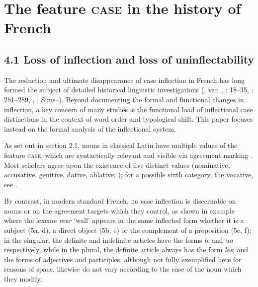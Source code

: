 \documentclass[output=paper]{langscibook}
\begin{document}
\section{The feature \textsc{case} in the history of French}
\subsection{4.1  Loss of inflection and loss of uninflectability}

The reduction and ultimate disappearance of case inflection in French has long formed the subject of detailed historical linguistic investigations (\citealt{Schøsler1984,Schøsler2013}, van \citealt{ReenenSchøsler2000}, \citealt{Sornicola2011}: 18–35, \citealt{Smith2011}: 281–289, \citealt{Ledgeway2012}, \citealt{Buridant2019}, Sims–\citealt{WilliamsBaerman2021}). Beyond documenting the formal and functional changes in inflection, a key concern of many studies is the functional load of inflectional case distinctions in the context of word order and typological shift. This paper focuses instead on the formal analysis of the inflectional system.

As set out in section 2.1, nouns in classical Latin have multiple values of the feature \textsc{case}, which are syntactically relevant and visible via agreement marking \citep{Corbett2006}. Most scholars agree upon the existence of five distinct values (nominative, accusative, genitive, dative, ablative; \citealt{DragomirescuNicolae2016}); for a possible sixth category, the vocative, see \citet{Ashdowne2016}. 

By contrast, in modern standard French, no case inflection is discernable on nouns or on the agreement targets which they control, as shown in example  where the lexeme \textit{mur} ‘wall’ appears in the same inflected form whether it is a subject (5a, d), a direct object (5b, e) or the complement of a preposition (5c, f); in the singular, the definite and indefinite articles have the forms \textit{le} and \textit{un} respectively, while in the plural, the definite article always has the form \textit{les}; and the forms of adjectives and participles, although not fully exemplified here for reasons of space, likewise do not vary according to the case of the noun which they modify.

\ea%
    \label{ex:key:5}
    \gll \\
         \\
    \glt
    \z %
\end{document}
